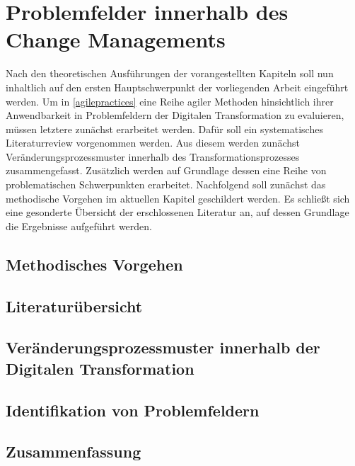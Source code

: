 \chapter{Problemfelder innerhalb des Change Managements}
\label{problemfields}


Nach den theoretischen Ausführungen der vorangestellten Kapiteln soll nun inhaltlich auf den ersten Hauptschwerpunkt der vorliegenden Arbeit eingeführt werden. Um in \ref{agilepractices} eine Reihe agiler Methoden hinsichtlich ihrer Anwendbarkeit in Problemfeldern der Digitalen Transformation zu evaluieren, müssen letztere zunächst erarbeitet werden. Dafür soll ein systematisches  Literaturreview vorgenommen werden. Aus diesem werden  zunächst Veränderungsprozessmuster innerhalb des Transformationsprozesses  zusammengefasst.  Zusätzlich werden auf  Grundlage dessen eine Reihe von problematischen Schwerpunkten erarbeitet. Nachfolgend soll zunächst das methodische Vorgehen im aktuellen Kapitel geschildert werden. Es schließt sich eine gesonderte Übersicht der erschlossenen Literatur an, auf dessen Grundlage  die Ergebnisse aufgeführt werden.  

\section{Methodisches Vorgehen}
\label{problemfields:methods}


\todots

\section{Literaturübersicht}


\todots

\section{Veränderungsprozessmuster innerhalb der Digitalen Transformation}
\label{problemfields:changepatterns}


\todots

\section{Identifikation von Problemfeldern}


\todots

\section{Zusammenfassung}


